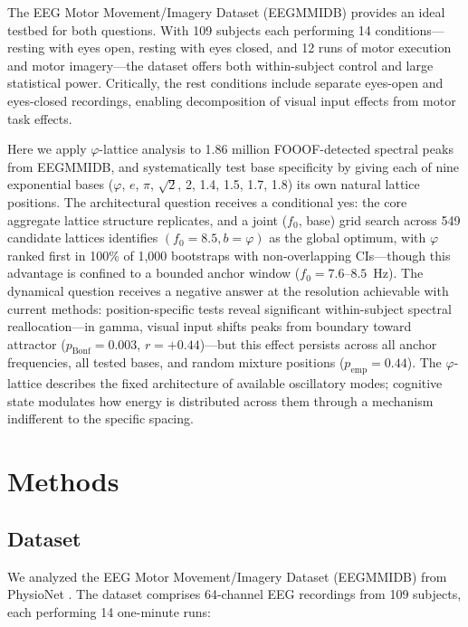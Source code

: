 \documentclass[11pt,a4paper]{article}
\newcommand{\phisym}{\varphi}
\newcommand{\fzero}{f_0}
\begin{document}
The EEG Motor Movement/Imagery Dataset (EEGMMIDB) provides an ideal testbed for both questions. With 109 subjects each performing 14 conditions---resting with eyes open, resting with eyes closed, and 12 runs of motor execution and motor imagery---the dataset offers both within-subject control and large statistical power. Critically, the rest conditions include separate eyes-open and eyes-closed recordings, enabling decomposition of visual input effects from motor task effects.

Here we apply $\phisym$-lattice analysis to 1.86 million FOOOF-detected spectral peaks from EEGMMIDB, and systematically test base specificity by giving each of nine exponential bases ($\phisym$, $e$, $\pi$, $\sqrt{2}$, 2, 1.4, 1.5, 1.7, 1.8) its own natural lattice positions. The architectural question receives a conditional yes: the core aggregate lattice structure replicates, and a joint ($\fzero$, base) grid search across 549 candidate lattices identifies $(\fzero = 8.5, b = \phisym)$ as the global optimum, with $\phisym$ ranked first in 100\% of 1,000 bootstraps with non-overlapping CIs---though this advantage is confined to a bounded anchor window ($\fzero = 7.6$--$8.5$~Hz). The dynamical question receives a negative answer at the resolution achievable with current methods: position-specific tests reveal significant within-subject spectral reallocation---in gamma, visual input shifts peaks from boundary toward attractor ($p_{\text{Bonf}} = 0.003$, $r = +0.44$)---but this effect persists across all anchor frequencies, all tested bases, and random mixture positions ($p_{\text{emp}} = 0.44$). The $\phisym$-lattice describes the fixed architecture of available oscillatory modes; cognitive state modulates how energy is distributed across them through a mechanism indifferent to the specific spacing.

\section{Methods}
\label{sec:methods}

\subsection{Dataset}
\label{sec:dataset}

We analyzed the EEG Motor Movement/Imagery Dataset (EEGMMIDB) from PhysioNet \parencite{goldberger2000physiobank, schalk2004bci2000}. The dataset comprises 64-channel EEG recordings from 109 subjects, each performing 14 one-minute runs:
\end{document}
